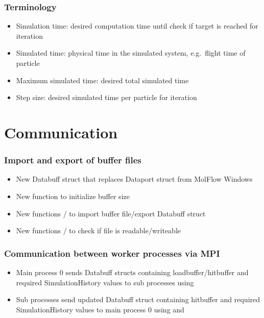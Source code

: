 \subsubsection{Terminology}
\begin{itemize}[noitemsep,topsep=0pt, partopsep=0pt]
\item Simulation time: desired computation time until check if target is reached for iteration
\item Simulated time: physical time in the simulated system, e.g.\ flight time of particle
\item Maximum simulated time: desired total simulated time
\item Step size: desired simulated time per particle for iteration
\end{itemize}

\section{Communication}
\subsubsection{Import and export of buffer files}
\begin{itemize}[noitemsep,topsep=0pt, partopsep=0pt]
\item New Databuff struct that replaces Dataport struct from MolFlow Windows
\end{itemize}
\begin{itemize}[noitemsep,topsep=0pt, partopsep=0pt]
\item New function  to initialize buffer size
\item New functions / to import buffer file/export Databuff struct
\item New functions / to check if file is readable/writeable
\end{itemize}

\subsubsection{Communication between worker processes via MPI}
\begin{itemize}[noitemsep,topsep=0pt, partopsep=0pt]
\item Main process 0 sends Databuff structs containing loadbuffer/hitbuffer and required SimulationHistory values to sub processes using 
\item Sub processes send updated Databuff struct containing hitbuffer and required SimulationHistory values to main process 0 using  and 
\end{itemize}

